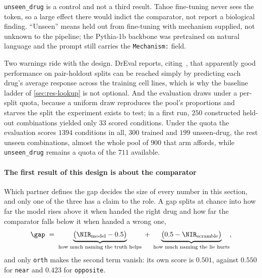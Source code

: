 \texttt{unseen\_drug} is a control and not a third result. Tahoe fine-tuning
never sees the token, so a large effect there would indict the comparator, not
report a biological finding. ``Unseen'' means held out from fine-tuning with
mechanism supplied, not unknown to the pipeline; the Pythia-1b backbone was
pretrained on natural language and the prompt still carries the
\texttt{Mechanism:} field.

Two warnings ride with the design. DrEval reports, citing~\cite{partin}, that
apparently good performance on pair-holdout splits can be reached simply by
predicting each drug's average response across the training cell lines, which is
why the baseline ladder of \cref{sec:res-lookup} is not optional. And the
evaluation draws under a per-split quota, because a uniform draw reproduces the
pool's proportions and starves the split the experiment exists to test; in a
first run,
$\num{250}$ constructed held-out combinations yielded only $\num{33}$ scored
conditions. Under the quota the evaluation scores $\num{1394}$ conditions in all,
$\num{300}$ trained and $\num{199}$ unseen-drug, the rest unseen combinations,
almost the whole pool of $\num{900}$ that arm affords, while
\texttt{unseen\_drug} remains a quota of the $\num{711}$ available.

\paragraph{The first result of this design is about the comparator} Which partner
defines the gap decides the size of every number in this section, and only one of
the three has a claim to the role. A gap splits at chance into how far the model
rises above it when handed the right drug and how far the comparator falls below
it when handed a wrong one,
\begin{equation}
 \gap \;=\; \underbrace{\big(\NIR_{\textrm{model}} - 0.5\big)}_{\textrm{how much naming the truth helps}}
 \;+\; \underbrace{\big(0.5 - \NIR_{\textrm{scramble}}\big)}_{\textrm{how much naming the lie hurts}},
\end{equation}
and only \texttt{orth} makes the second term vanish: its own score is $0.501$,
against $0.550$ for \texttt{near} and $0.423$ for \texttt{opposite}.

